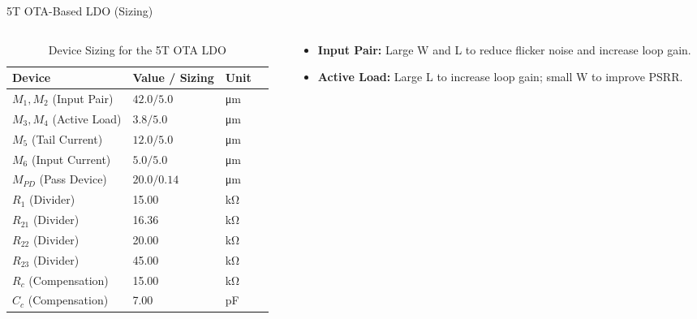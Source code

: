 \documentclass[10pt, aspectratio=169]{beamer}
\begin{document}
\begin{frame}{5T OTA-Based LDO (Sizing)}
    \begin{columns}[T,onlytextwidth]
        \begin{column}{0.4\textwidth}
            \begin{table}[htbp]
                \scriptsize
                \centering
                \label{tab:sizing_5t}
                \begin{tabular}{@{}lllc@{}}
                    \toprule
                    \textbf{Device} & \textbf{Value / Sizing} & \textbf{Unit} \\
                    \midrule
                    $M_1, M_2$ (Input Pair) & $42.0 / 5.0$ & \unit{\micro\meter} \\
                    $M_3, M_4$ (Active Load) & $3.8 / 5.0$ & \unit{\micro\meter} \\
                    \midrule
                    $M_5$ (Tail Current) & $12.0 / 5.0$ & \unit{\micro\meter} \\
                    $M_6$ (Input Current) & $5.0 / 5.0$ & \unit{\micro\meter} \\
                    \midrule
                    $M_{PD}$ (Pass Device) & $20.0 / 0.14$ & \unit{\micro\meter} \\
                    \midrule
                    $R_1$ (Divider) & 15.00 & \unit{\kilo\ohm} \\
                    $R_{21}$ (Divider) & 16.36 & \unit{\kilo\ohm} \\
                    $R_{22}$ (Divider) & 20.00 & \unit{\kilo\ohm} \\
                    $R_{23}$ (Divider) & 45.00 & \unit{\kilo\ohm} \\
                    $R_c$ (Compensation) & 15.00 & \unit{\kilo\ohm} \\
                    $C_c$ (Compensation) & 7.00 & \unit{\pico\farad} \\
                    \bottomrule
                \end{tabular}
                \caption{Device Sizing for the 5T OTA LDO}
            \end{table}
        \end{column}
        \begin{column}{0.6\textwidth}
            \begin{itemize}
                \item \textbf{Input Pair:} Large W and L to reduce flicker noise and increase loop gain.
                \item \textbf{Active Load:} Large L to increase loop gain; small W to improve PSRR.

\end{itemize}
\end{column}
\end{columns}
\end{frame}
\end{document}
